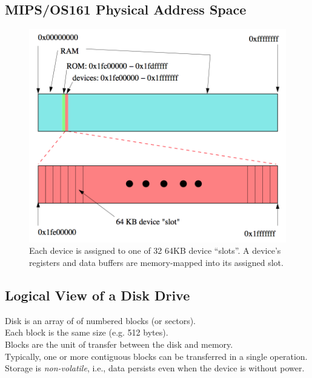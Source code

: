 \documentclass[12pt]{article}
\theoremstyle{plain}
\theoremstyle{definition}
\begin{document}
\subsection{MIPS/OS161 Physical Address Space}
\begin{figure}[H]
  \centering
  \includegraphics[scale=0.55]{pictures/os161_addrspace.png}
  \caption{Each device is assigned to one of 32 64KB device ``slots''. A device's registers and data buffers are memory-mapped into its assigned slot.}
  \label{fig:os161_addrspace}
\end{figure}

\subsection{Logical View of a Disk Drive}
Disk is an array of of numbered blocks (or sectors). \\
Each block is the same size (e.g. 512 bytes). \\

Blocks are the unit of transfer between the disk and memory. \\
Typically, one or more contiguous blocks can be transferred in a single operation. \\

Storage is \emph{non-volatile}, i.e., data persists even when the device is without power.
\end{document}
